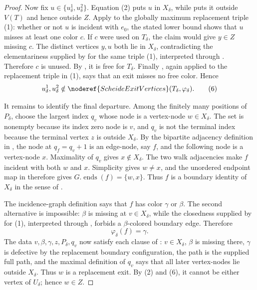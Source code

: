 \begin{proof}
Now fix $u\in\{u^1_\delta,u^2_\delta\}$.  Equation (2) puts $u$ in
$X_\delta$, while  puts it outside
$V(T)$ and hence outside $Z$.  Apply
 to the globally maximum
replacement triple (1): whether or not $u$ is incident with $e_0$, the
stated lower bound shows that $u$ misses at least one color $c$.  If $c$
were used on $T_\delta$, the claim would give $y\in Z$ missing $c$.
The distinct vertices $y,u$ both lie in $X_\delta$, contradicting the
elementariness supplied by  for the
same triple (1), interpreted through
.  Therefore $c$ is unused.  By
, it is free for $T_\delta$.  Finally
, again applied to the replacement triple in
(1), says that an exit misses no free color.  Hence
\[
 u^1_\delta,u^2_\delta\notin
 \noderef{ScheideExitVertices}(T_\delta,\varphi_\delta).        \tag{6}
\]

It remains to identify the final departure.  Among the finitely many
positions of $P_\delta$, choose the largest index $q_v$ whose node is a
vertex-node $w\in X_\delta$.  The set is nonempty because its index zero
node is $v$, and $q_v$ is not the terminal index because the terminal
vertex $z$ is outside $X_\delta$.  By the bipartite adjacency definition
in , the node at
$q_f=q_v+1$ is an edge-node, say $f$, and the following node is a
vertex-node $x$.  Maximality of $q_v$ gives $x\notin X_\delta$.
The two walk adjacencies make $f$ incident with both $w$ and $x$.
Simplicity gives $w\ne x$, and the unordered endpoint map in
 therefore gives
$G.\operatorname{ends}(f)=\{w,x\}$.  Thus $f$ is a boundary identity of
$X_\delta$ in the sense of .

The incidence-graph definition says that $f$ has color $\gamma$ or
$\beta$.  The second alternative is impossible: $\beta$ is missing at
$v\in X_\delta$, while the closedness supplied by
 for (1), interpreted through
, forbids a $\beta$-colored boundary
edge.  Therefore
\[
                         \varphi_\delta(f)=\gamma.              \tag{7}
\]
The data $v,\beta,\gamma,z,P_\delta,q_v$ now satisfy each clause of
: $v\in X_\delta$, $\beta$ is missing there,
$\gamma$ is defective by the replacement boundary configuration, the
path is the supplied full path, and the maximal definition of $q_v$
says that all later vertex-nodes lie outside $X_\delta$.  Thus $w$ is a
replacement exit.  By (2) and (6), it cannot be either vertex of
$U_\delta$; hence $w\in Z$.


\end{proof}
